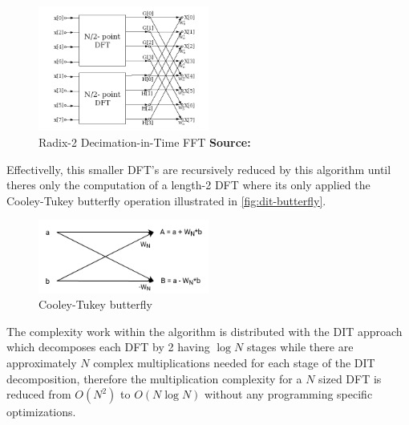 \documentclass[
  oneside,
  11pt, a4paper,
  footinclude=true,
  headinclude=true,
  cleardoublepage=empty
]{scrbook}
\newcommand*{\source}[1]{%
    \textbf{Source:} \cite{#1}%
}
\begin{document}
\begin{figure}[h] 
    \centering
    \includegraphics[width=0.5\textwidth]{imgs/dit_fft.png}
    \caption{Radix-2 Decimation-in-Time FFT \source{jones2014digital}}
    \label{fig:dit-fft}
\end{figure}


Effectivelly, this smaller DFT's are recursively reduced by this algorithm until theres only the computation of a length-2 DFT where its only applied the Cooley-Tukey butterfly operation \cite{chu1999inside} illustrated in \autoref{fig:dit-butterfly}.

\begin{figure}[h] 
    \centering
    \includegraphics[width=0.5\textwidth]{imgs/dit_butterfly.png}
    \caption{Cooley-Tukey butterfly}
    \label{fig:dit-butterfly}
\end{figure}


The complexity work within the algorithm is distributed with the DIT approach which decomposes each DFT by 2 having \(\log{N}\) stages \cite{smith2007mathematics} while there are approximately \(N\) complex multiplications needed for each stage of the DIT decomposition, therefore the multiplication complexity for a \(N\) sized DFT is reduced from \(O(N^{2})\) to \(O(N \log{N})\) without any programming specific optimizations.
\end{document}
